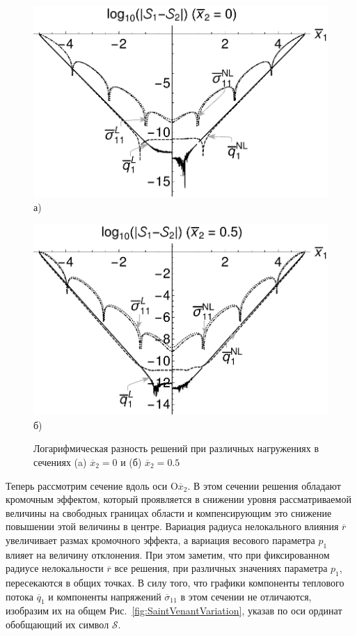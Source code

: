 \begin{figure}[ht]
    \begin{minipage}[b][][b]{0.49\linewidth}\centering
        \includegraphics[width=\linewidth]{pics/StabilityLogX0.pdf} \\ а)
    \end{minipage}
    \hfill
    \begin{minipage}[b][][b]{0.49\linewidth}\centering
        \includegraphics[width=\linewidth]{pics/StabilityLogX05.pdf} \\ б)
    \end{minipage}
    \caption{Логарифмическая разность решений при различных нагружениях в сечениях (a) $\overline{x}_2 = 0$ и (б) $\overline{x}_2 = 0.5$}
    \label{fig:StabilityLog10}
\end{figure}

Теперь рассмотрим сечение вдоль оси $\text{O}\overline{x}_2$. В этом сечении решения обладают кромочным эффектом, который проявляется в снижении уровня рассматриваемой величины на свободных границах области и компенсирующим это снижение повышении этой величины в центре. Вариация радиуса нелокального влияния $\overline{r}$ увеличивает размах кромочного эффекта, а вариация весового параметра $p_1$ влияет на величину отклонения. При этом заметим, что при фиксированном радиусе нелокальности $\overline{r}$ все решения, при различных значениях параметра $p_1$, пересекаются в общих точках. В силу того, что графики компоненты теплового потока $\overline{q}_1$ и компоненты напряжений $\overline{\sigma}_{11}$ в этом сечении не отличаются, изобразим их на общем Рис.~\ref{fig:SaintVenantVariation}, указав по оси ординат обобщающий их символ $\mathcal{S}$.

